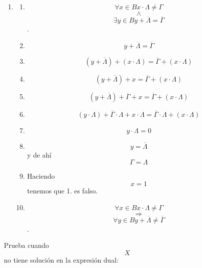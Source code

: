 \documentclass[
]{article}
\providecommand{\tightlist}{%
  \setlength{\itemsep}{0pt}\setlength{\parskip}{0pt}}
\begin{document}
\begin{enumerate}
\begin{enumerate}
\begin{enumerate}
\begin{enumerate}
\begin{enumerate}
          \begin{enumerate}
          \def\labelenumvi{\arabic{enumvi}.}
          \tightlist
          \item
            \begin{enumerate}
            \def\labelenumvii{\arabic{enumvii}.}
            \tightlist
            \item
              \[\forall{x \in B}{{x \cdot \Lambda} \neq \Gamma}\]\[\land\]\[\exists{y \in B}{{y + \overline{\Lambda}} = \overline{\Gamma}}\].
            \item
              \[{y + \overline{\Lambda}} = \overline{\Gamma}\]
            \item
              \[{\left( {y + \overline{\Lambda}} \right) + \left( {x \cdot \Lambda} \right)} = {\overline{\Gamma} + \left( {x \cdot \Lambda} \right)}\]
            \item
              \[{\left( {y + \overline{\Lambda}} \right) + x} = {\overline{\Gamma} + \left( {x \cdot \Lambda} \right)}\]
            \item
              \[{{\left( {y + \overline{\Lambda}} \right) + \overline{\Gamma}} + x} = {\overline{\Gamma} + \left( {x \cdot \Lambda} \right)}\]
            \item
              \[{{\left( {y \cdot \Lambda} \right) + {\overline{\Gamma} \cdot \Lambda}} + {x \cdot \Lambda}} = {{\overline{\Gamma} \cdot \Lambda} + \left( {x \cdot \Lambda} \right)}\]
            \item
              \[{y \cdot \Lambda} = 0\]
            \item
              \[y = \overline{\Lambda}\] y de ahí \[\Gamma = \Lambda\]
            \item
              Haciendo \[x = 1\] tenemos que 1. es falso.
            \item
              \[\forall{x \in B}{{x \cdot \Lambda} \neq \Gamma}\]\[\Rightarrow\]\[\forall{y \in B}{{y + \overline{\Lambda}} \neq \overline{\Gamma}}\].
            \end{enumerate}
          \end{enumerate}

          Prueba cuando \[X\] no tiene solución en la expresión dual:


\end{enumerate}
\end{enumerate}
\end{enumerate}
\end{enumerate}
\end{enumerate}
\end{document}
